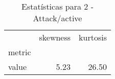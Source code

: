 \begin{table}[htbp]
\caption{Estatísticas para 2 - Attack/active}
\label{tab:2_-_attack_active_skewkurt}
\begin{tabular}{lrr}
\toprule
 & skewness & kurtosis \\
metric &  &  \\
\midrule
value & 5.23 & 26.50 \\
\bottomrule
\end{tabular}
\end{table}
